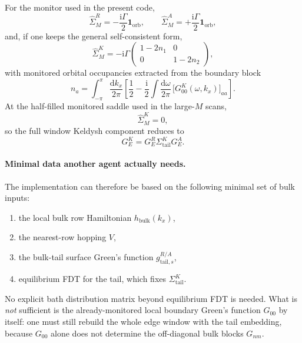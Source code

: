 \documentclass[11pt]{article}
\newcommand{\ii}{\mathrm{i}}
\newcommand{\rd}{\mathrm{d}}
\newcommand{\Id}{\mathbf{1}}
\begin{document}
For the monitor used in the present code,
\begin{equation}
  \hat\Sigma_M^{R}=-\frac{\ii\Gamma}{2}\Id_{\mathrm{orb}},\qquad
  \hat\Sigma_M^{A}=+\frac{\ii\Gamma}{2}\Id_{\mathrm{orb}},
\end{equation}
and, if one keeps the general self-consistent form,
\begin{equation}
  \hat\Sigma_M^{K}
  =
  -\ii\Gamma
  \begin{pmatrix}
    1-2n_1 & 0\\
    0 & 1-2n_2
  \end{pmatrix},
\end{equation}
with monitored orbital occupancies extracted from the boundary block
\begin{equation}
  n_a
  =
  \int_{-\pi}^{\pi}\frac{\rd k_x}{2\pi}
  \left[
    \frac{1}{2}
    -
    \frac{\ii}{2}\int\frac{\rd\omega}{2\pi}\,
    \bigl[G_{00}^{K}(\omega,k_x)\bigr]_{aa}
  \right].
\end{equation}
At the half-filled monitored saddle used in the large-\(M\) scans,
\begin{equation}
  \hat\Sigma_M^{K}=0,
\end{equation}
so the full window Keldysh component reduces to
\begin{equation}
  G_E^{K}
  =
  G_E^{R}\Sigma_{\mathrm{tail}}^{K}G_E^{A}.
\end{equation}

\paragraph{Minimal data another agent actually needs.}

The implementation can therefore be based on the following minimal set of bulk
inputs:
\begin{enumerate}
\item the local bulk row Hamiltonian \(h_{\mathrm{bulk}}(k_x)\),
\item the nearest-row hopping \(V\),
\item the bulk-tail surface Green's function \(g_{\mathrm{tail},s}^{R/A}\),
\item equilibrium FDT for the tail, which fixes \(\Sigma_{\mathrm{tail}}^{K}\).
\end{enumerate}
No explicit bath distribution matrix beyond equilibrium FDT is needed.  What is
\emph{not} sufficient is the already-monitored local boundary Green's function
\(G_{00}\) by itself: one must still rebuild the whole edge window with the tail
embedding, because \(G_{00}\) alone does not determine the off-diagonal bulk
blocks \(G_{nm}\).
\end{document}

